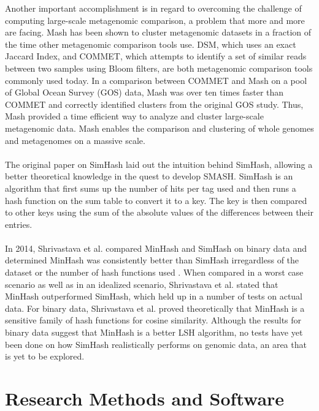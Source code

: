 \documentclass[12pt, letterpaper]{article}
\begin{document}
Another important accomplishment is in regard to overcoming the challenge of computing large-scale metagenomic comparison, a problem that more and more are facing. Mash has been shown to cluster metagenomic datasets in a fraction of the time other metagenomic comparison tools use. DSM, which uses an exact Jaccard Index, and COMMET, which attempts to identify a set of similar reads between two samples using Bloom filters, are both metagenomic comparison tools commonly used today. In a comparison between COMMET and Mash on a pool of Global Ocean Survey (GOS) data, Mash was over ten times faster than COMMET and correctly identified clusters from the original GOS study. Thus, Mash provided a time efficient way to analyze and cluster large-scale metagenomic data. Mash enables the comparison and clustering of whole genomes and metagenomes on a massive scale. \\ \\
The original paper on SimHash laid out the intuition behind SimHash, allowing a better theoretical knowledge in the quest to develop SMASH.\cite{simhash} SimHash is an algorithm that first sums up the number of hits per tag used and then runs a hash function on the sum table to convert it to a key. The key is then compared to other keys using the sum of the absolute values of the differences between their entries. \\ \\
In 2014, Shrivastava et al. compared MinHash and SimHash on binary data and determined MinHash was consistently better than SimHash irregardless of the dataset or the number of hash functions used \cite{SimvsMin}. When compared in a worst case scenario as well as in an idealized scenario, Shrivastava et al. stated that MinHash outperformed SimHash, which held up in a number of tests on actual data. For binary data, Shrivastava et al. proved theoretically that MinHash is a sensitive family of hash functions for cosine similarity. Although the results for binary data suggest that MinHash is a better LSH algorithm, no tests have yet been done on how SimHash realistically performs on genomic data, an area that is yet to be explored.

\section{Research Methods and Software}
\end{document}
